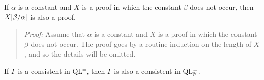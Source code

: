 %

\begin{Lthm} \label{lemma:prsub}
  If $\alpha$ is a constant and $X$ is a proof in which the constant $\beta$ does not occur, then $X[\beta/\alpha]$ is also a proof.
\end{Lthm}

\begin{quote} 
  \textit{Proof:} Assume that $\alpha$ is a constant and $X$ is a proof in which the constant $\beta$ does not occur.
  The proof goes by a routine induction on the length of $X$, and so the details will be omitted.
%
\end{quote}



\begin{Lthm} \label{lemma:const}
  If $\Gamma$ is a consistent in QL$^=$, then $\Gamma$ is also a consistent in QL$^=_{\mathbb{N}}$.
\end{Lthm}

